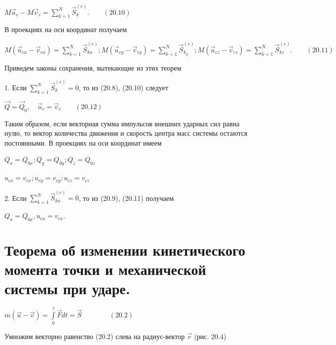 {\begin{center}
\par $M \vec{u}_c - M \vec{v}_c = \sum\limits_{k=1}^N \vec{S}_k^{(e)}. \quad\quad  (20.10)$

\par В проекциях на оси координат получаем

\par $M (\vec{u}_{cx} - \vec{v}_{cx}) = \sum\limits_{k=1}^N \vec{S}_{kx}^{(e)}; M (\vec{u}_{cy} - \vec{v}_{cy}) = \sum\limits_{k=1}^N \vec{S}_{k_y}^{(e)}; M (\vec{u}_{cz} - \vec{v}_{cz}) = \sum\limits_{k=1}^N \vec{S}_{kz}^{(e)}. \quad\quad (20.11)$

\par Приведем законы сохранения, вытекающие из этих теорем

\par 1. Если $\sum\limits_{k=1}^N \vec{S}_k^{(e)} = 0$, то из (20.8), (20.10) следует 

\par $\vec{Q} = \vec{Q}_0, \quad \vec{u}_c = \vec{v}_c \quad\quad (20.12)$

\par Таким образом, если векторная сумма импульсов внешних ударных сил равна нулю, то вектор количества движения и скорость центра масс системы остаются постоянными. В проекциях на оси координат имеем

\par $Q_x=Q_{0x}; Q_y=Q_{0y}; Q_z=Q_{0z}$

\par $u_{cx}=v_{cx}; u_{cy}=v_{cy}; u_{cz}=v_{cz}$

\par 2. Если $\sum\limits_{k=1}^N \vec{S}_{kx}^{(e)} = 0$, то из (20.9), (20.11) получаем

\par $Q_x=Q_{0x}, u_{cx}=v_{cx}.$

\end{center}
\section{Теорема об изменении кинетического момента точки и механической системы при ударе.}
\begin{center}

\par $ m(\vec{u}-\vec{v}) = \int\limits_0^\tau \vec{F}dt = \vec{S}   \qquad \qquad (20.2) $ 

\par Умножим векторно равенство (20.2) слева на радиус-вектор $\vec{r}$ (рис. 20.4)


\end{center}}
